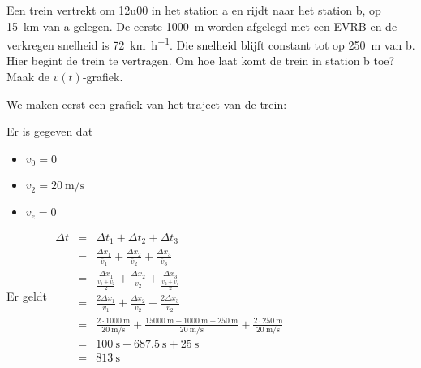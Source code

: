 \documentclass{ximera}
\begin{document}
\begin{exercise}
        Een trein vertrekt om 12u00 in het station a en rijdt naar het station b, op \SI{15}{\kilo\meter} van a gelegen. 
        De eerste \SI{1000}{m} worden afgelegd met een EVRB en de verkregen snelheid is \SI{72}{\kilo\meter\per\hour}. 
        Die snelheid blijft constant tot op \SI{250}{\meter} van b. Hier begint de trein te vertragen. Om hoe laat komt de trein in station b toe? Maak de $v(t)$-grafiek.

        \begin{oplossing}
        We maken eerst een grafiek van het traject van de trein: 
        \begin{image}
            
        \end{image}
        Er is gegeven dat 
        \begin{itemize}
            \item \(v_0 = 0\)
            \item \(v_2 = \SI{20}{\meter\per\second}\)
            \item \(v_e = 0\)
        \end{itemize}

        Er geldt
        \(
        \begin{array}{rcl}
        \Delta t &=& \Delta t_1 + \Delta t_2 + \Delta t_3 \\
        &=& \frac{\Delta x_1}{\overline{v}_1} + \frac{\Delta x_2}{\overline{v}_2} + \frac{\Delta x_3}{\overline{v}_3}\\
        &=& \frac{\Delta x_1}{\frac{v_0 + v_2}{2}} + \frac{\Delta x_2}{v_2} + \frac{\Delta x_3}{\frac{v_2 + v_e}{2}}\\
        &=& \frac{2\Delta x_1}{\overline{v}_1} + \frac{\Delta x_2}{v_2} + \frac{2\Delta x_3}{v_2}\\
        &=& \frac{2 \cdot \SI{1000}{\meter}}{\SI{20}{\meter\per\second}} + \frac{\SI{15000}{\meter} - \SI{1000}{\meter} - \SI{250}{\meter}}{\SI{20}{\meter\per\second}} + \frac{2\cdot \SI{250}{\meter}}{\SI{20}{\meter\per\second}}\\
        &=& \SI{100}{\second} + \SI{687.5}{\second} + \SI{25}{\second}\\ 
        &=& \SI{813}{\second}
        \end{array} 
        \)


\end{oplossing}
\end{exercise}
\end{document}
